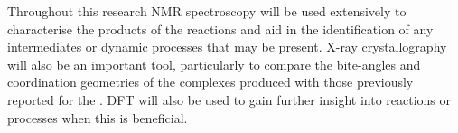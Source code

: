 Throughout this research \gls{NMR} spectroscopy will be used extensively to characterise the products of the reactions and aid in the identification of any intermediates or dynamic processes that may be present.  X-ray crystallography will also be an important tool, particularly to compare the bite-angles and coordination geometries of the \tBuxantphos{} complexes produced with those previously reported for the \Phxantphos.  \Gls{DFT} will also be used to gain further insight into reactions or processes when this is beneficial.


%
%
%
